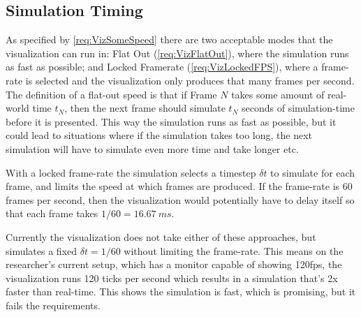 \subsection{Simulation Timing}

As specified by \cref{req:VizSomeSpeed} there are two acceptable modes that the visualization can run in:
Flat Out (\cref{req:VizFlatOut}), where the simulation runs as fast as possible;
and Locked Framerate (\cref{req:VizLockedFPS}), where a frame-rate is selected and the visualization only produces that many frames per second.
The definition of a flat-out speed is that if Frame $N$ takes some amount of real-world time $t_N$, then the next frame should simulate $t_N$ seconds of simulation-time before it is presented.
This way the simulation runs as fast as possible, but it could lead to situations where if the simulation takes too long, the next simulation will have to simulate even more time and take longer etc.

With a locked frame-rate the simulation selects a timestep $\delta{t}$ to simulate for each frame, and limits the speed at which frames are produced.
If the frame-rate is 60 frames per second, then the visualization would potentially have to delay itself so that each frame takes $1/60 = \SI{16.67}{ms}$.

Currently the visualization does not take either of these approaches, but simulates a fixed $\delta{t} = 1/60$ without limiting the frame-rate.
This means on the researcher's current setup, which has a monitor capable of showing 120fps, the visualization runs 120 ticks per second which results in a simulation that's 2x faster than real-time.
This shows the simulation is fast, which is promising, but it fails the requirements.
